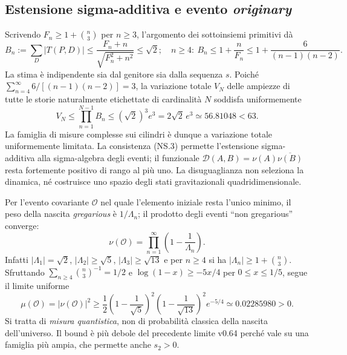 \documentclass[11pt,a4paper]{article}
\begin{document}
\subsection*{Estensione sigma-additiva e evento \emph{originary}}
Scrivendo $F_n\ge1+\binom n3$ per $n\ge3$, l'argomento dei sottoinsiemi primitivi d\`a
\begin{equation}
B_n:=\sum_D|T(P,D)|\le\frac{F_n+n}{\sqrt{F_n^2+n^2}}\le\sqrt2;
\quad n\ge4:\ B_n\le1+\frac n{F_n}\le1+\frac6{(n-1)(n-2)}.\tag{NS.5}
\end{equation}
La stima \`e indipendente sia dal genitore sia dalla sequenza $s$. Poich\'e
$\sum_{n=4}^{\infty}6/[(n-1)(n-2)]=3$, la variazione totale $V_N$ delle ampiezze di tutte le storie naturalmente etichettate di cardinalit\`a $N$ soddisfa uniformemente
\begin{equation}
\boxed{V_N\le\prod_{n=1}^{N-1}B_n\le(\sqrt2)^3 e^3
=2\sqrt2\,e^3\simeq56.81048<63.}\tag{NS.6}
\end{equation}
La famiglia di misure complesse sui cilindri \`e dunque a variazione totale uniformemente limitata. La consistenza (NS.3) permette l'estensione sigma-additiva alla sigma-algebra degli eventi; il funzionale $\mathcal D(A,B)=\nu(A)\overline{\nu(B)}$ resta fortemente positivo di rango al pi\`u uno. La disuguaglianza non seleziona la dinamica, n\'e costruisce uno spazio degli stati gravitazionali quadridimensionale.

Per l'evento covariante $\mathcal O$ nel quale l'elemento iniziale resta l'unico minimo, il peso della nascita \emph{gregarious} \`e $1/\Lambda_n$; il prodotto degli eventi ``non gregarious'' converge:
\begin{equation}
\nu(\mathcal O)=\prod_{n=1}^{\infty}\left(1-\frac1{\Lambda_n}\right).\tag{NS.7}
\end{equation}
Infatti $|\Lambda_1|=\sqrt2$, $|\Lambda_2|\ge\sqrt5$, $|\Lambda_3|\ge\sqrt{13}$ e per $n\ge4$ si ha $|\Lambda_n|\ge1+\binom n3$. Sfruttando $\sum_{n\ge4}\binom n3^{-1}=1/2$ e $\log(1-x)\ge-5x/4$ per $0\le x\le1/5$, segue il limite uniforme
\begin{equation}
\boxed{\mu(\mathcal O)=|\nu(\mathcal O)|^2\ge
\frac12\left(1-\frac1{\sqrt5}\right)^2
\left(1-\frac1{\sqrt{13}}\right)^2 e^{-5/4}
\simeq0.02285980>0.}\tag{NS.8}
\end{equation}
Si tratta di \emph{misura quantistica}, non di probabilit\`a classica della nascita dell'universo. Il bound \`e pi\`u debole del precedente limite v0.64 perch\'e vale su una famiglia pi\`u ampia, che permette anche $s_2>0$.
\end{document}
